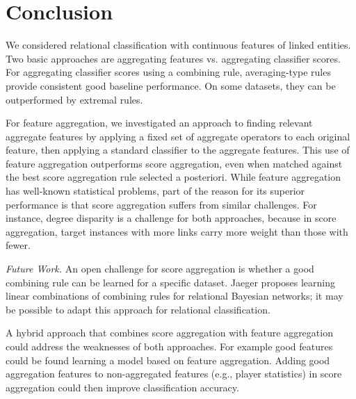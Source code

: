 \documentclass[conference]{IEEEtran}
\begin{document}



\section{Conclusion}


We considered relational classification with continuous features of linked entities. Two basic approaches are aggregating features vs. aggregating classifier scores. For aggregating classifier scores using a combining rule, averaging-type rules provide consistent good baseline performance. On some datasets, they can be outperformed by extremal rules.%

For feature aggregation, we investigated an approach to finding relevant aggregate features by applying a fixed set of aggregate operators to each original feature, then applying a standard classifier to the aggregate features. This use of feature aggregation outperforms score aggregation, even when matched against the best score aggregation rule selected a posteriori. While feature aggregation has well-known statistical problems, part of the reason for its superior performance is that score aggregation suffers from similar challenges. For instance, degree disparity is a challenge for both approaches, because in score aggregation, target instances with more links carry more weight than those with fewer.

{\em Future Work.} An open challenge for score aggregation is whether a good combining rule can be learned for a specific dataset. %
Jaeger \cite{Jaeger2007} proposes learning linear combinations of combining rules for relational Bayesian networks; it may be possible to adapt this approach for %
relational classification.

A hybrid approach that combines score aggregation with feature aggregation could address the weaknesses of both approaches.
For example good features could be found learning a model based on feature aggregation. Adding  good aggregation features to non-aggregated features (e.g., player statistics) in score aggregation could then improve classification accuracy.
\end{document}
